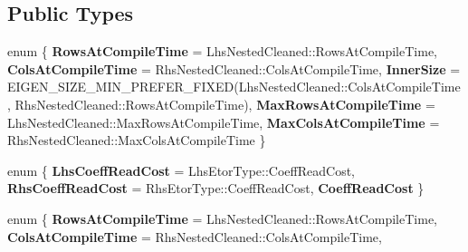 \subsection*{Public Types}
\begin{DoxyCompactItemize}
\item 
\mbox{\label{struct_eigen_1_1internal_1_1product__evaluator_3_01_product_3_01_lhs_00_01_rhs_00_01_lazy_produc1ed1c0c8715953d10d735722e273406b_afbe5c293f8c10f2ea3410b64cac559f3}} 
enum \{ \newline
{\bfseries Rows\+At\+Compile\+Time} = Lhs\+Nested\+Cleaned\+:\+:Rows\+At\+Compile\+Time, 
{\bfseries Cols\+At\+Compile\+Time} = Rhs\+Nested\+Cleaned\+:\+:Cols\+At\+Compile\+Time, 
{\bfseries Inner\+Size} = E\+I\+G\+E\+N\+\_\+\+S\+I\+Z\+E\+\_\+\+M\+I\+N\+\_\+\+P\+R\+E\+F\+E\+R\+\_\+\+F\+I\+X\+ED(Lhs\+Nested\+Cleaned\+:\+:Cols\+At\+Compile\+Time, Rhs\+Nested\+Cleaned\+:\+:Rows\+At\+Compile\+Time), 
{\bfseries Max\+Rows\+At\+Compile\+Time} = Lhs\+Nested\+Cleaned\+:\+:Max\+Rows\+At\+Compile\+Time, 
\newline
{\bfseries Max\+Cols\+At\+Compile\+Time} = Rhs\+Nested\+Cleaned\+:\+:Max\+Cols\+At\+Compile\+Time
 \}
\item 
\mbox{\label{struct_eigen_1_1internal_1_1product__evaluator_3_01_product_3_01_lhs_00_01_rhs_00_01_lazy_produc1ed1c0c8715953d10d735722e273406b_ad2aae9bd45fc10ed17629dfa8337b58c}} 
enum \{ {\bfseries Lhs\+Coeff\+Read\+Cost} = Lhs\+Etor\+Type\+:\+:Coeff\+Read\+Cost, 
{\bfseries Rhs\+Coeff\+Read\+Cost} = Rhs\+Etor\+Type\+:\+:Coeff\+Read\+Cost, 
{\bfseries Coeff\+Read\+Cost}
 \}
\item 
\mbox{\label{struct_eigen_1_1internal_1_1product__evaluator_3_01_product_3_01_lhs_00_01_rhs_00_01_lazy_produc1ed1c0c8715953d10d735722e273406b_aec6ff68208ab9ce24109727da3f38d62}} 
enum \{ \newline
{\bfseries Rows\+At\+Compile\+Time} = Lhs\+Nested\+Cleaned\+:\+:Rows\+At\+Compile\+Time, 
{\bfseries Cols\+At\+Compile\+Time} = Rhs\+Nested\+Cleaned\+:\+:Cols\+At\+Compile\+Time, 

\end{DoxyCompactItemize}
